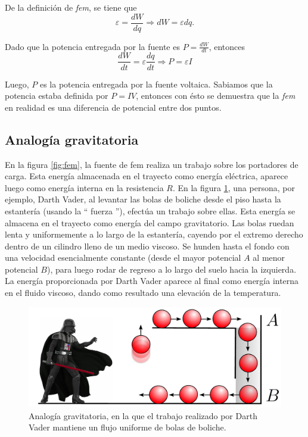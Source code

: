 De la definición de \textit{fem}, se tiene que
$$\varepsilon = \frac{dW}{dq} \Rightarrow dW = \varepsilon dq.$$

Dado que la potencia entregada por la fuente es $P = \frac{dW}{dt}$, entonces
$$\frac{dW}{dt} = \varepsilon \frac{dq}{dt} \Rightarrow \boxed{P = \varepsilon I}$$

Luego, $P$ es la potencia entregada por la fuente voltaica. Sabiamos que la potencia estaba definida por $P = IV$, entonces con ésto se demuestra que la \textit{fem} en realidad es una diferencia de potencial entre dos puntos.

\subsection*{Analogía gravitatoria}

En la figura \ref{fig:fem}, la fuente de fem realiza un trabajo sobre los portadores de carga. Esta energía almacenada en el trayecto como energía eléctrica, aparece luego como energía interna en la resistencia $R$. En la figura \ref{fig:Analogia-Gravitatoria}, una persona, por ejemplo, Darth Vader, al levantar las bolas de boliche desde el piso hasta la estantería (usando la `` fuerza ''), efectúa un trabajo sobre ellas. Esta energía se almacena en el trayecto como energía del campo gravitatorio. Las bolas ruedan lenta y uniformemente a lo largo de la estantería, cayendo por el extremo derecho dentro de un cilindro lleno de un medio viscoso. Se hunden hasta el fondo con una velocidad esencialmente constante (desde el mayor potencial $A$ al menor potencial $B$), para luego rodar de regreso a lo largo del suelo hacia la izquierda. La energía proporcionada por Darth Vader aparece al final como energía interna en el fluido viscoso, dando como resultado una elevación de la temperatura.

\begin{figure}[H]
    \centering
    \includegraphics[scale = 0.59]{Figuras/Interpretacion-Fem.pdf}
    \caption{Analogía gravitatoria, en
la que el trabajo realizado por Darth Vader mantiene un flujo uniforme de bolas de boliche.}
    \label{fig:Analogia-Gravitatoria}
\end{figure}

